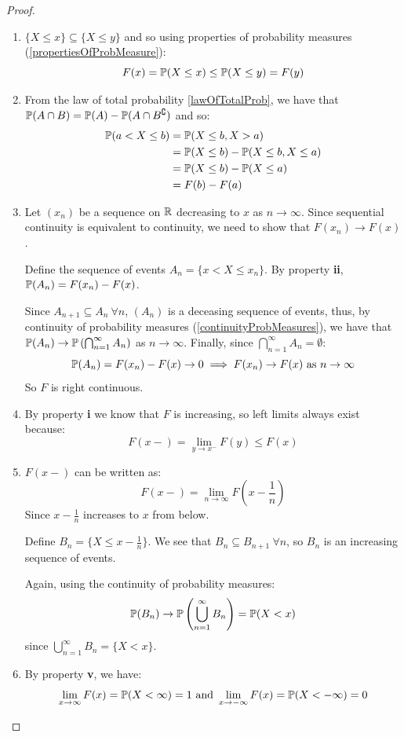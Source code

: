 \documentclass[../main.tex]{subfiles}
\begin{document}
\begin{proof}
 \begin{enumerate}
   \item $\{X \leq x\} \subseteq \{X \leq y\}$ and so using properties of probability measures (\cref{propertiesOfProbMeasure}):
     \[
       F(x) = \P(X \leq x) \leq \P(X \leq y) = F(y)
     \]
   \item From the law of total probability \cref{lawOfTotalProb}, we have that $\P(A \cap B) = \P(A) - \P(A \cap B^{\comp})$ and so:
     \begin{align*}
       \P(a < X \leq b) &= \P(X \leq b, X > a) \\
                        &= \P(X \leq b) - \P(X \leq b, X \leq a) \\
                        &= \P(X \leq b) - \P(X \leq a) \\
                        &= F(b) - F(a)
     \end{align*}
   \item Let $(x_n)$ be a sequence on $\R$ decreasing to $x$ as $n \to \infty$.
     Since sequential continuity is equivalent to continuity, we need to show that $F(x_n) \to F(x)$.

     Define the sequence of events $A_n = \{x < X \leq x_n\}$.
     By property \textbf{ii}, $\P(A_n) = F(x_n) - F(x)$.

     Since $A_{n + 1} \subseteq A_n\ \forall n$, $(A_n)$ is a deceasing sequence of events, thus, by continuity of probability measures (\cref{continuityProbMeasures}), we have that $\P(A_n) \to \P\left(\bigcap_{n = 1}^{\infty} A_n\right)$ as $n \to \infty$.
     Finally, since $\bigcap_{n = 1}^{\infty} A_n = \emptyset$:
     \[
       \P(A_n) = F(x_n) - F(x) \to 0 \implies F(x_n) \to F(x) \text{ as $n \to \infty$}
     \]
     So $F$ is right continuous.
   \item By property \textbf{i} we know that $F$ is increasing, so left limits always exist because:
     \[
       F(x-) = \lim_{y \to x^{-}} F(y) \leq F(x)
     \]
   \item $F(x-)$ can be written as:
     \[
       F(x-) = \lim_{n \to \infty} F\left(x - \frac{1}{n}\right)
     \]
     Since $x - \frac{1}{n}$ increases to $x$ from below.

     Define $B_n = \{X \leq x - \frac{1}{n}\}$.
     We see that $B_{n} \subseteq B_{n + 1}\ \forall n$, so $B_n$ is an increasing sequence of events.

     Again, using the continuity of probability measures:
     \[
       \P(B_n) \to \P\left(\bigcup_{n = 1}^{\infty} B_n\right) = \P(X < x)
     \]
     since $\bigcup_{n = 1}^{\infty} B_n = \{X < x\}$.
   \item By property \textbf{v}, we have:
     \[
       \lim_{x \to \infty} F(x) = \P(X < \infty) = 1  \text{ and } \lim_{x \to -\infty} F(x) = \P(X < - \infty) = 0
     \]
 \end{enumerate}
\end{proof}
\end{document}
